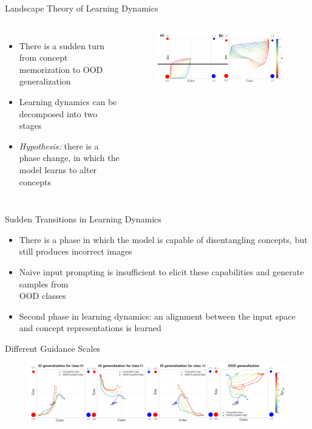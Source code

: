 \begin{frame}[t]{Landscape Theory of Learning Dynamics}
\begin{columns}
\begin{itemize}
    \item There is a sudden turn from concept memorization to OOD generalization
    \item Learning dynamics can be decomposed into two stages
    \item \textit{Hypothesis:} there is a phase change, in which the model learns to alter concepts
\end{itemize}
\begin{figure}
    \centering
    \includegraphics[width=\linewidth]{figures/figure_5.png}
\end{figure}
\end{columns}
\end{frame}

\begin{frame}[t]{Sudden Transitions in Learning Dynamics}
\begin{itemize}
    \item There is a phase in which the model is capable of disentangling concepts, but still produces incorrect images
    \item Naive input prompting is insufficient to elicit these capabilities and generate samples from \\OOD classes
    \item Second phase in learning dynamics: an
alignment between the input space and concept representations is learned
\end{itemize}
\end{frame}

\begin{frame}[t]{Different Guidance Scales}
\begin{figure}
    \centering
    \includegraphics[width=0.92\linewidth]{figures/cfg.png}
\end{figure}
\end{frame}

